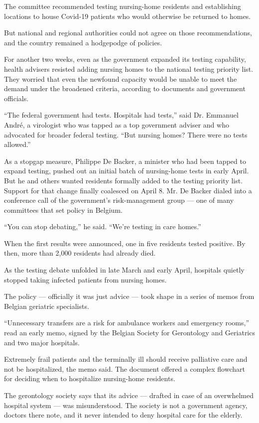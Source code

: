 The committee recommended testing nursing-home residents and
establishing locations to house Covid-19 patients who would otherwise be
returned to homes.

But national and regional authorities could not agree on those
recommendations, and the country remained a hodgepodge of policies.

For another two weeks, even as the government expanded its testing
capability, health advisers resisted adding nursing homes to the
national testing priority list. They worried that even the newfound
capacity would be unable to meet the demand under the broadened
criteria, according to documents and government officials.

``The federal government had tests. Hospitals had tests,'' said Dr.
Emmanuel André, a virologist who was tapped as a top government adviser
and who advocated for broader federal testing. ``But nursing homes?
There were no tests allowed.''

As a stopgap measure, Philippe De Backer, a minister who had been tapped
to expand testing, pushed out an initial batch of nursing-home tests in
early April. But he and others wanted residents formally added to the
testing priority list. Support for that change finally coalesced on
April 8. Mr. De Backer dialed into a conference call of the government's
risk-management group --- one of many committees that set policy in
Belgium.

``You can stop debating,'' he said. ``We're testing in care homes.''

When the first results were announced, one in five residents tested
positive. By then, more than 2,000 residents had already died.

As the testing debate unfolded in late March and early April, hospitals
quietly stopped taking infected patients from nursing homes.

The policy --- officially it was just advice --- took shape in a series
of memos from Belgian geriatric specialists.

``Unnecessary transfers are a risk for ambulance workers and emergency
rooms,'' read an early memo, signed by the Belgian Society for
Gerontology and Geriatrics and two major hospitals.

Extremely frail patients and the terminally ill should receive
palliative care and not be hospitalized, the memo said. The document
offered a complex flowchart for deciding when to hospitalize
nursing-home residents.

The gerontology society says that its advice --- drafted in case of an
overwhelmed hospital system --- was misunderstood. The society is not a
government agency, doctors there note, and it never intended to deny
hospital care for the elderly.

